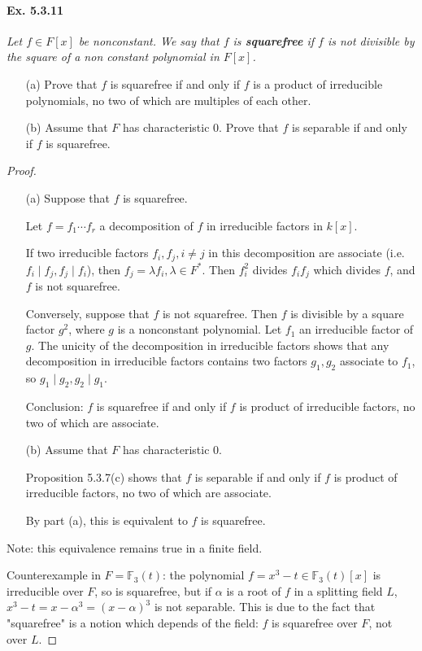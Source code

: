 \documentclass[11pt,a4paper]{article}
\newcommand{\F}{\mathbb{F}}
\begin{document}
\paragraph{Ex. 5.3.11}

{\it Let $f \in F[x]$ be nonconstant. We say that $f$ is {\bf squarefree} if $f$ is not divisible by the square of a non constant polynomial in $F[x]$.
\begin{enumerate}
\item[(a)] Prove that $f$ is squarefree if and only if $f$ is a product of irreducible polynomials, no two of which are multiples of each other.
\item[(b)] Assume that $F$ has characteristic $0$. Prove that $f$ is separable if and only if $f$ is squarefree.
\end{enumerate}
}

\begin{proof}
\begin{enumerate}
\item[(a)]
Suppose that $f$ is squarefree.

Let $f = f_1\cdots f_r$ a decomposition of $f$ in irreducible factors in $k[x]$.

If two irreducible factors $f_i,f_j, i\neq j$ in this decomposition are associate (i.e. $f_i \mid f_j, f_j \mid f_i$), then $f_j = \lambda f_i, \lambda \in F^*$. Then $f_i^2$ divides $f_if_j$ which divides $f$, and $f$ is not squarefree. 

Conversely, suppose that $f$ is not squarefree. Then $f$ is divisible by a square factor $g^2$, where $g$ is a nonconstant polynomial. Let $f_1$ an irreducible factor of $g$. The unicity of the decomposition in irreducible factors shows that any decomposition in irreducible factors contains two factors $g_1,g_2$ associate to $f_1$, so $g_1 \mid g_2, g_2 \mid g_1$.

Conclusion: $f$ is squarefree if and only if $f$ is product of irreducible factors, no two of which are associate.

\item[(b)]
Assume that $F$ has characteristic $0$.

Proposition 5.3.7(c) shows that $f$ is separable if and only if $f$ is product of irreducible factors, no two of which are associate.

By part (a), this is equivalent to $f$ is squarefree.

\end{enumerate}

\bigskip

Note: this equivalence remains true in a finite field. 

Counterexample in $F = \F_3(t)$: the polynomial $f= x^3 - t \in \F_3(t)[x]$ is irreducible over $F$, so is squarefree, but if $\alpha$ is a root of $f$ in a splitting field $L$, $x^3 - t = x- \alpha^3  = (x-\alpha)^3$ is not separable. This is due to the fact that  "squarefree" is a notion which depends of the field: $f$ is squarefree over $F$, not over $L$.
\end{proof}
\end{document}
